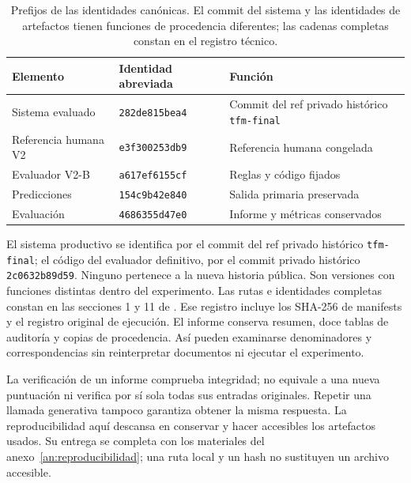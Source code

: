 \begin{table}[htbp]
\centering
\small
\renewcommand{\arraystretch}{1.2}
\begin{tabular}{L{4.4cm} L{3.3cm} L{4.4cm}}
\hline
Elemento & Identidad abreviada & Función \\
\hline
Sistema evaluado & \texttt{282de815bea4} & Commit del ref privado histórico \texttt{tfm-final} \\
Referencia humana V2 & \texttt{e3f300253db9} & Referencia humana congelada \\
Evaluador V2-B & \texttt{a617ef6155cf} & Reglas y código fijados \\
Predicciones & \texttt{154c9b42e840} & Salida primaria preservada \\
Evaluación & \texttt{4686355d47e0} & Informe y métricas conservados \\
\hline
\end{tabular}
\caption[Identidades del experimento]{Prefijos de las identidades canónicas.
El commit del sistema y las identidades de artefactos tienen funciones de
procedencia diferentes; las cadenas completas constan en el registro técnico.}
\label{tab:identidades-experimento}
\end{table}

El sistema productivo se identifica por el commit del ref privado histórico
\texttt{tfm-final}; el código del evaluador definitivo, por el commit privado
histórico \texttt{2c0632b89d59}. Ninguno pertenece a la nueva historia pública.
Son versiones con funciones distintas dentro del experimento.
Las rutas e identidades completas constan en las secciones 1 y 11 de
.
Ese registro incluye los SHA-256 de manifests y el registro original de
ejecución. El informe conserva resumen, doce tablas
de auditoría y copias de procedencia. Así pueden examinarse denominadores
y correspondencias sin reinterpretar documentos ni ejecutar el experimento.

La verificación de un informe comprueba integridad; no equivale a una nueva
puntuación ni verifica por sí sola todas sus entradas originales. Repetir
una llamada generativa tampoco garantiza obtener la misma respuesta.
La reproducibilidad aquí descansa en conservar y hacer accesibles los
artefactos usados. Su entrega se completa con los materiales del
anexo~\ref{an:reproducibilidad}; una ruta local y un hash no sustituyen
un archivo accesible.
